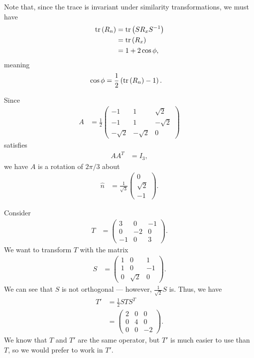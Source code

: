 \documentclass[10pt]{mypackage}
\begin{document}
Note that, since the trace is invariant under similarity transformations, we must have
\begin{align*}
  \tr\left(R_{n}\right) &= \tr\left(SR_{x}S^{-1}\right)\\
                        &= \tr\left(R_x\right)\\
                        &= 1 + 2\cos\phi,
\end{align*}
meaning
\begin{align*}
  \cos\phi &= \frac{1}{2}\left(\tr\left(R_{n}\right) - 1\right).
\end{align*}
\begin{example}
  Since
  \begin{align*}
    A &= \frac{1}{2} \begin{pmatrix}-1 & 1 & \sqrt{2} \\ -1 & 1 & -\sqrt{2} \\ -\sqrt{2} &-\sqrt{2} & 0\end{pmatrix}
  \end{align*}
  satisfies
  \begin{align*}
    AA^{T} &= I_{3},
  \end{align*}
  we have $A$ is a rotation of $2\pi/3$ about
  \begin{align*}
    \widehat{n} &= \frac{1}{\sqrt{3}} \begin{pmatrix}0\\\sqrt{2}\\-1\end{pmatrix}.
  \end{align*}
\end{example}
\begin{example}
  Consider
  \begin{align*}
    T &= \begin{pmatrix}3 & 0 & -1\\0 & -2 & 0 \\ -1 & 0 & 3\end{pmatrix}.
  \end{align*}
  We want to transform $T$ with the matrix
  \begin{align*}
    S &= \begin{pmatrix}1 & 0 & 1 \\ 1 & 0 & -1 \\ 0 & \sqrt{2} & 0\end{pmatrix}.
  \end{align*}
  We can see that $S$ is not orthogonal --- however, $\frac{1}{\sqrt{2}}S$ is. Thus, we have
  \begin{align*}
    T' &= \frac{1}{2}STS^{T}\\
       &= \begin{pmatrix}2 & 0 & 0 \\ 0 & 4 & 0 \\ 0 & 0 & -2\end{pmatrix}.
  \end{align*}
  We know that $T$ and $T'$ are the same operator, but $T'$ is much easier to use than $T$, so we would prefer to work in $T'$.
\end{example}
\end{document}
